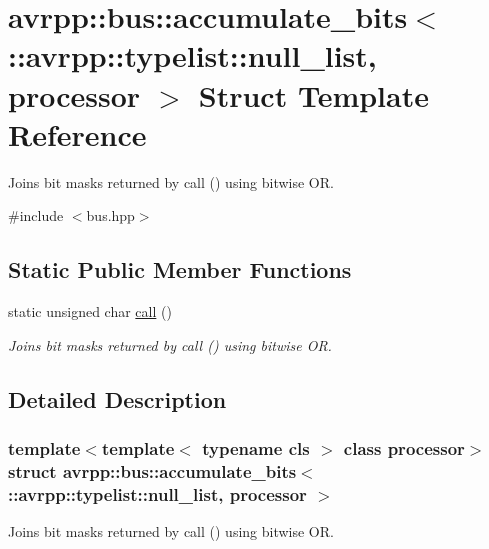 \hypertarget{structavrpp_1_1bus_1_1accumulate__bits_3_01_1_1avrpp_1_1typelist_1_1null__list_00_01processor_01_4}{
\section{avrpp::bus::accumulate\_\-bits$<$ ::avrpp::typelist::null\_\-list, processor $>$ Struct Template Reference}
\label{structavrpp_1_1bus_1_1accumulate__bits_3_01_1_1avrpp_1_1typelist_1_1null__list_00_01processor_01_4}
}


Joins bit masks returned by call () using bitwise OR.  




{\ttfamily \#include $<$bus.hpp$>$}

\subsection*{Static Public Member Functions}
\begin{DoxyCompactItemize}
\item 
static unsigned char \hyperlink{structavrpp_1_1bus_1_1accumulate__bits_3_01_1_1avrpp_1_1typelist_1_1null__list_00_01processor_01_4_a2fbd71664b7a29e126e3d88473d57f80}{call} ()
\begin{DoxyCompactList}\small\item\em Joins bit masks returned by call () using bitwise OR. \item\end{DoxyCompactList}\end{DoxyCompactItemize}


\subsection{Detailed Description}
\subsubsection*{template$<$template$<$ typename cls $>$ class processor$>$ struct avrpp::bus::accumulate\_\-bits$<$ ::avrpp::typelist::null\_\-list, processor $>$}

Joins bit masks returned by call () using bitwise OR. 

